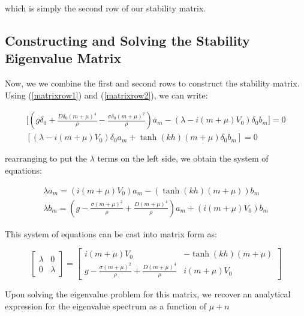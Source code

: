 \documentclass{article}
\begin{document}
\vspace{15} 

\noindent which is simply the second row of our stability matrix. 

\subsection{Constructing and Solving the Stability Eigenvalue Matrix}

Now, we we combine the first and second rows to construct the stability matrix. Using (\ref{matrixrow1}) and (\ref{matrixrow2}), we can write: 


\begin{align} \label{matrix}
  \bigg[(g\delta_{0} + \frac{D\delta_{0}(m+\mu)^4}{\rho} - \frac{\sigma \delta_{0} (m+\mu)^2}{\rho})a_{m} - (\lambda - i(m+\mu)V_{0})\delta_{0}b_{m}\bigg] = 0 
  \\
  [(\lambda - i(m+\mu)V_{0})\delta_{0}a_{m} + \tanh(kh)(m+\mu)\delta_{0}b_{m} ] = 0 
\end{align}

rearranging to put the \( \lambda \) terms on the left side, we obtain the system of equations:



\begin{align} \label{matrix2}
  \lambda a_{m} =  (i(m+\mu)V_{0})a_{m} - (\tanh(kh)(m+\mu))b_{m} 
  \\
  \lambda b_{m} =  (g - \frac{\sigma(m+\mu)^2}{\rho} + \frac{D(m+\mu)^4}{\rho})a_m + (i(m+\mu)V_{0})b_{m} 
\end{align}

This system of equations can be cast into matrix form as: 

\begin{equation}
    \begin{bmatrix} \label{stabilitymatrix}
    \lambda & 0\\
    0 & \lambda 
    \end{bmatrix}
    = 
    \begin{bmatrix} \label{stabilitymatrix}
    i(m+\mu)V_{0} & -\tanh(kh)(m+\mu)\\
    g - \frac{\sigma(m+\mu)^2}{\rho} + \frac{D(m+\mu)^4}{\rho} & i(m+\mu)V_{0} 
    \end{bmatrix}
\end{equation}

\vspace{10} 

Upon solving the eigenvalue problem for this matrix, we recover an analytical expression for the eigenvalue spectrum as a function of \(\mu+n\) 
\end{document}
